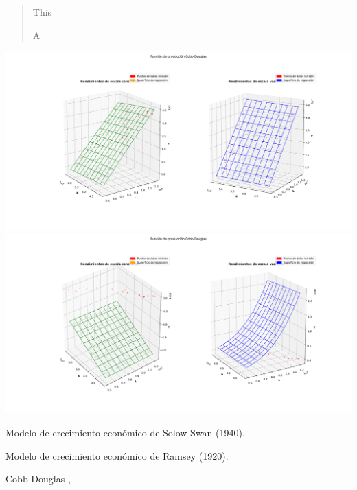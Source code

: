 \documentclass[a4paper,fleqn]{cas-dc}
\begin{document}

\begin{abstract}
This

\noindent A
\end{abstract}

\begin{graphicalabstract}
\centering
\includegraphics[width=0.9\paperwidth]{figs/withnaturalog.pdf}\\
\includegraphics[width=0.9\paperwidth]{figs/withoutnaturalog.pdf}
\end{graphicalabstract}

\begin{highlights}
\item Modelo de crecimiento económico de Solow-Swan (1940).
\item Modelo de crecimiento económico de Ramsey (1920).
\end{highlights}

\begin{keywords}
Cobb-Douglas \sep \BEC
\end{keywords}
\end{document}
